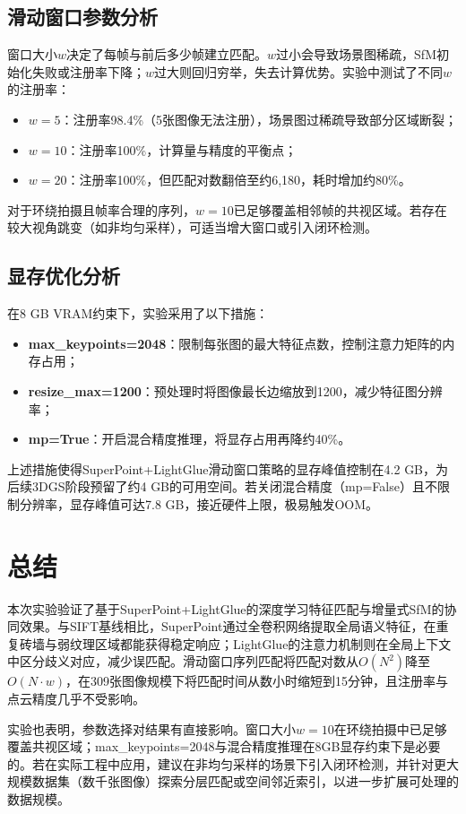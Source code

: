 \documentclass[UTF8,a4paper]{ctexart}
\begin{document}
\subsection{滑动窗口参数分析}

窗口大小$w$决定了每帧与前后多少帧建立匹配。$w$过小会导致场景图稀疏，SfM初始化失败或注册率下降；$w$过大则回归穷举，失去计算优势。实验中测试了不同$w$的注册率：

\begin{itemize}
    \item $w = 5$：注册率98.4\%（5张图像无法注册），场景图过稀疏导致部分区域断裂；
    \item $w = 10$：注册率100\%，计算量与精度的平衡点；
    \item $w = 20$：注册率100\%，但匹配对数翻倍至约6,180，耗时增加约80\%。
\end{itemize}

对于环绕拍摄且帧率合理的序列，$w=10$已足够覆盖相邻帧的共视区域。若存在较大视角跳变（如非均匀采样），可适当增大窗口或引入闭环检测。

\subsection{显存优化分析}

在8 GB VRAM约束下，实验采用了以下措施：

\begin{itemize}
    \item \textbf{max_keypoints=2048}：限制每张图的最大特征点数，控制注意力矩阵的内存占用；
    \item \textbf{resize\_max=1200}：预处理时将图像最长边缩放到1200，减少特征图分辨率；
    \item \textbf{mp=True}：开启混合精度推理，将显存占用再降约40\%。
\end{itemize}

上述措施使得SuperPoint+LightGlue滑动窗口策略的显存峰值控制在4.2 GB，为后续3DGS阶段预留了约4 GB的可用空间。若关闭混合精度（mp=False）且不限制分辨率，显存峰值可达7.8 GB，接近硬件上限，极易触发OOM。

\section{总结}

本次实验验证了基于SuperPoint+LightGlue的深度学习特征匹配与增量式SfM的协同效果。与SIFT基线相比，SuperPoint通过全卷积网络提取全局语义特征，在重复砖墙与弱纹理区域都能获得稳定响应；LightGlue的注意力机制则在全局上下文中区分歧义对应，减少误匹配。滑动窗口序列匹配将匹配对数从$O(N^2)$降至$O(N \cdot w)$，在309张图像规模下将匹配时间从数小时缩短到15分钟，且注册率与点云精度几乎不受影响。

实验也表明，参数选择对结果有直接影响。窗口大小$w=10$在环绕拍摄中已足够覆盖共视区域；max_keypoints=2048与混合精度推理在8GB显存约束下是必要的。若在实际工程中应用，建议在非均匀采样的场景下引入闭环检测，并针对更大规模数据集（数千张图像）探索分层匹配或空间邻近索引，以进一步扩展可处理的数据规模。
\end{document}
